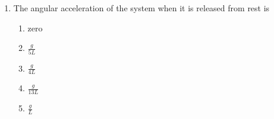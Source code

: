 \documentclass{../../../oss-classkick}
\begin{document}
\begin{multicols}{2}
\begin{enumerate}[leftmargin=18pt,resume]
  \item The angular acceleration of the system when it is released from rest is
    \begin{enumerate}[nosep,leftmargin=18pt,label=(\Alph*)]
    \item zero
    \item $\displaystyle\frac{g}{5L}$
    \item $\displaystyle\frac{g}{4L}$
    \item $\displaystyle\frac{g}{13L}$
    \item  $\displaystyle\frac{g}{L}$
    \end{enumerate}
    \label{lightrod2}
  \end{enumerate}
\end{multicols}
\newpage


\genfreedirections

\end{document}
